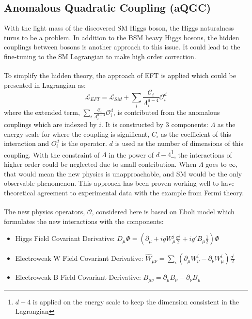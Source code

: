 \subsection{Anomalous Quadratic Coupling (aQGC)}
With the light mass of the discovered SM Higgs boson, the Higgs naturalness turns to be a problem. In addition to the BSM heavy Higgs bosons, the hidden couplings between bosons is another approach to this issue. It could lead to the fine-tuning to the SM Lagrangian to make high order correction. 
\\
\\To simplify the hidden theory, the approach of EFT is applied which could be presented in Lagrangian as:
\begin{equation}
\mathcal{L}_{EFT} = \mathcal{L}_{SM} + \sum_{i}\frac{\mathcal{C}_i}{\Lambda_{i}^{d-4}}\mathcal{O}^{d}_{i}
\end{equation}
where the extended term, $\sum_{i}\frac{\mathcal{C}_i}{\Lambda_{i}^{d-4}}\mathcal{O}^{d}_{i}$, is contributed from the anomalous couplings which are indexed by $i$. It is constructed by 3 components: $\Lambda$ as the energy scale for where the coupling is significant, $C_{i}$ as the coefficient of this interaction and $O^{d}_i$ is the operator. $d$ is used as the number of dimensions of this coupling. With the constraint of $\Lambda$ in the power of $d-4$\footnote{$d-4$ is applied on the energy scale to keep the dimension consistent in the Lagrangian}, the interactions of higher order could be neglected due to small contribution. When $\Lambda$ goes to $\infty$, that would mean the new physics is unapproachable, and SM would be the only observable phenomenon. This approach has been proven working well to have theoretical agreement to experimental data with the example from Fermi theory. 
\\
\\The new physics operators, $\mathcal{O}$, considered here is based on Eboli model\cite{Eboli:2016kko,Eboli:2000ad} which formulates the new interactions with the components:
\begin{itemize}
	\item{Higgs Field Covariant Derivative}: $D_{\mu}\Phi =(\partial_\mu + igW^j_{\mu}\frac{\sigma^{j}}{2}+ig'B_\mu\frac{1}{2})\Phi $
	\item{Electroweak W Field Covariant Derivative}: $\hat{W}_{\mu\nu}=\sum_{i}(\partial_\mu W_\nu^i - \partial_\nu W_\mu^i)\frac{\sigma^i}{2}$
	\item{Electroweak B Field Covariant Derivative}: $B_{\mu\nu} = \partial_\mu B_\nu - \partial_\nu B_\mu$
\end{itemize}
